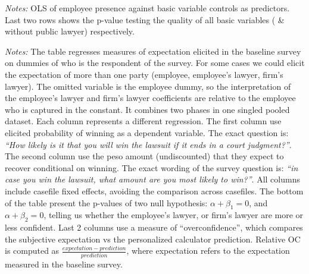 \begin{table}[!ht]
    \caption{Employee presence}
    \label{pactor_reg}
    \begin{center}
    \scriptsize{}
    \end{center}
    \scriptsize
    \textit{Notes:} OLS of employee presence against basic variable controls as predictors. Last two rows shows the p-value testing the quality of all basic variables ( \& without public lawyer) respectively.
     
\end{table}

\begin{table}[!ht]
    \caption{Expectations Relative to Prediction}
    \label{prediction_cases}
   \begin{center}
    \scriptsize{}
    \end{center}
    \scriptsize
\textit{Notes:} The table regresses measures of expectation elicited in the baseline survey on dummies of who is the respondent of the survey. For some cases we could elicit the expectation of more than one party (employee, employee's lawyer, firm's lawyer). The omitted variable is the employee dummy, so the interpretation of the employee's lawyer and firm's lawyer coefficients are relative to the employee who is captured in the constant. It combines two phases in one singled pooled dataset. Each column represents a different regression. The first column use elicited probability of winning as a dependent variable. The exact question is: \textit{``How likely is it that you will win the lawsuit if it ends in a court judgment?''}. The second column use the peso amount (undiscounted) that they expect to recover conditional on winning. The exact wording of the survey question is: \textit{``in case you win the lawsuit, what amount are you most likely to win?''}.  All columns include casefile fixed effects, avoiding the comparison across casefiles. The bottom of the table present the p-values of two null hypothesis:  $\alpha + \beta_1=0$, and $\alpha + \beta_2=0$, telling us whether the employee's lawyer, or firm's lawyer are more or less confident. Last 2 columns use a measure of ``overconfidence'', which compares the subjective expectation vs the personalized calculator prediction. Relative OC is computed as $\frac{expectation-prediction}{prediction}$, where expectation refers to the expectation measured in the baseline survey.
\end{table}

